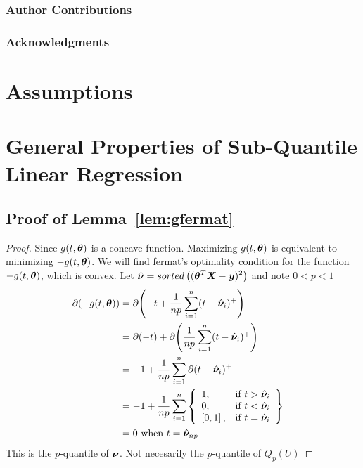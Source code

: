 \documentclass{article} %
\begin{document}
	
	\subsubsection*{Author Contributions}
	
	\subsubsection*{Acknowledgments}	
	
	\newpage

	
	
	
	\begin{appendices}
		
	\newpage
	\appendix
	\startcontents[sections]
	\newpage
	\section{Assumptions}
	\section{General Properties of Sub-Quantile Linear Regression}\label{app:general-proofs}
	\subsection{Proof of Lemma~\ref{lem:gfermat}}
	\label{app:gfermat}
	\begin{proof}
		Since $\displaystyle g(t,{\bm{\theta}})$ is a concave function. Maximizing $g(t,{\bm{\theta}})$ is equivalent to minimizing $-g(t,{\bm{\theta}})$. We will find fermat's optimality condition for the function $\displaystyle -g(t,{\bm{\theta}})$, which is convex. 
		Let $\displaystyle \hat{{\bm{\nu}}} = sorted\left(({\bm{\theta}}^T{\bm{X}} - {\bm{y}})^2\right)$ and note $\displaystyle 0 < p < 1$
		\begin{align}
			\partial{\displaystyle (-g(t,\boldsymbol{\theta}})) &= \partial{\left(-t + \frac{1}{np}\sum_{i=1}^{n}(t-\hat{{\bm{\nu}}}_i)^+\right)} &&\\
			&= \partial{(-t)} + \partial{\left(\frac{1}{np}\sum_{i=1}^{n}(t-\hat{{\bm{\nu}}}_i)^+\right)}&&\\
			&= -1 + \frac{1}{np}\sum_{i=1}^{n}\partial{(t-\hat{{\bm{\nu}}}_i)^+} &&\\
			&= -1 + \frac{1}{np}\sum_{i=1}^{n}
			\left\{
			\begin{array}{lr}
				1, & \text{if } t > \hat{{\bm{\nu}}}_i\\
				0, & \text{if } t < \hat{{\bm{\nu}}}_i \\
				\left[0,1\right], & \text{if } t = \hat{{\bm{\nu}}}_i \\
			\end{array}
			\right\}&&\\
			&= 0 \text{ when }\displaystyle t = \hat{{\bm{\nu}}}_{np}&&
		\end{align}
		This is the $p$-quantile of $\displaystyle {\bm{\nu}}$. Not necesarily the $p$-quantile of $Q_p(U)$
	\end{proof}


\end{appendices}
\end{document}
